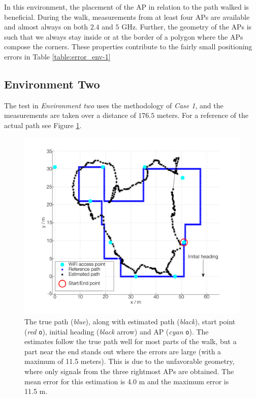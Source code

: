 \documentclass{LTHthesis}
\begin{document}
In this environment, the placement of the AP in relation to the path walked is beneficial. During the walk, measurements from at least four APs are available and almost always on both $2.4$ and $5$ GHz.  Further, the geometry of the APs is such that we always stay inside or at the border of a polygon where the APs compose the corners. These properties contribute to the fairly small positioning errors in Table \ref{table:error_env-1}  
%
\subsection{Environment Two}
%
The test in \emph{Environment two} uses the methodology of \emph{Case 1}, and the measurements are taken over a distance of $176.5$ meters. For a reference of the actual path see Figure \ref{true_vs_est_env_2_05}.    
%

\begin{figure}[!hbt]

\includegraphics[width=1\textwidth ]{images/pure_rssi/true_vs_est_env_2_05}
\caption{The true path (\emph{blue}), along with estimated path (\emph{black}), start point (\emph{red} \texttt{o}), initial heading (\emph{black} arrow) and AP (\emph{cyan} \texttt{o}). The estimates follow the true path well for most parts of the walk, but a part near the end stands out where the errors are large (with a maximum of 11.5 meters). This is due to the unfavorable geometry, where only signals from the three rightmost APs are obtained. The mean error for this estimation is 4.0 m and the maximum error is 11.5 m.}\label{true_vs_est_env_2_05}
\end{figure}
%
\end{document}

